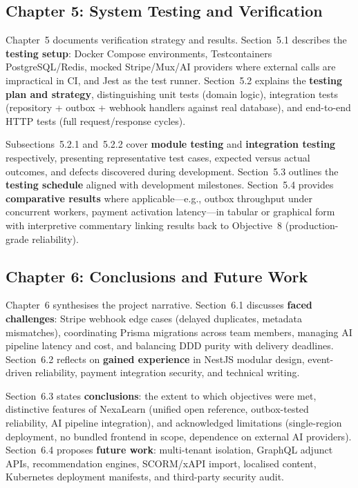 \subsection{Chapter 5: System Testing and Verification}
\label{subsec:doc-ch5}

Chapter~5 documents verification strategy and results. Section~5.1 describes the \textbf{testing setup}: Docker Compose environments, Testcontainers PostgreSQL/Redis, mocked Stripe/Mux/AI providers where external calls are impractical in CI, and Jest as the test runner. Section~5.2 explains the \textbf{testing plan and strategy}, distinguishing unit tests (domain logic), integration tests (repository + outbox + webhook handlers against real database), and end-to-end HTTP tests (full request/response cycles).

Subsections~5.2.1 and~5.2.2 cover \textbf{module testing} and \textbf{integration testing} respectively, presenting representative test cases, expected versus actual outcomes, and defects discovered during development. Section~5.3 outlines the \textbf{testing schedule} aligned with development milestones. Section~5.4 provides \textbf{comparative results} where applicable---e.g., outbox throughput under concurrent workers, payment activation latency---in tabular or graphical form with interpretive commentary linking results back to Objective~8 (production-grade reliability).

\subsection{Chapter 6: Conclusions and Future Work}
\label{subsec:doc-ch6}

Chapter~6 synthesises the project narrative. Section~6.1 discusses \textbf{faced challenges}: Stripe webhook edge cases (delayed duplicates, metadata mismatches), coordinating Prisma migrations across team members, managing AI pipeline latency and cost, and balancing DDD purity with delivery deadlines. Section~6.2 reflects on \textbf{gained experience} in NestJS modular design, event-driven reliability, payment integration security, and technical writing.

Section~6.3 states \textbf{conclusions}: the extent to which objectives were met, distinctive features of NexaLearn (unified open reference, outbox-tested reliability, AI pipeline integration), and acknowledged limitations (single-region deployment, no bundled frontend in scope, dependence on external AI providers). Section~6.4 proposes \textbf{future work}: multi-tenant isolation, GraphQL adjunct APIs, recommendation engines, SCORM/xAPI import, localised content, Kubernetes deployment manifests, and third-party security audit.

